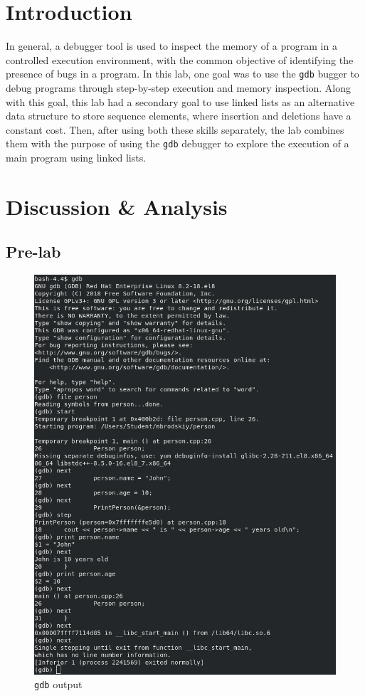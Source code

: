 \documentclass[
	letterpaper, %
	10pt, %
]{CSUniSchoolLabReport}
\begin{document}
\section{Introduction}

In general, a debugger tool is used to inspect the memory of a program in a controlled execution environment, with the common objective of identifying the presence of bugs in a program. In this lab, one goal was to use the \texttt{gdb} bugger to debug programs through step-by-step execution and memory inspection. Along with this goal, this lab had a secondary goal to use linked lists as an alternative data structure to store sequence elements, where insertion and deletions have a constant cost. Then, after using both these skills separately, the lab combines them with the purpose of using the \texttt{gdb} debugger to explore the execution of a main program using linked lists.

\section{Discussion \& Analysis} 

\subsection{Pre-lab}

\begin{figure}[H]
  \centering
  \includegraphics[width=.7\textwidth]{Figures/gdb.png}
  \caption{\texttt{gdb} output}
  \label{fig:1}
\end{figure}
\end{document}
